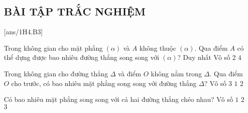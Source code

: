 \subsection{BÀI TẬP TRẮC NGHIỆM}
[ans/1H4.B3]
\setcounter{ex}{0}

\begin{ex} Trong không gian cho mặt phẳng $(\alpha)$ và $A$ không thuộc $(\alpha)$. Qua điểm $A$ có thể dựng được bao nhiêu đường thẳng song song với $(\alpha)$?
	\choice
	{Duy nhất}
	{\True Vô số }
	{$2$}
	{$4$}
	\loigiai{}
\end{ex}
\begin{ex}%
	Trong không gian cho đường thẳng $\Delta$ và điểm $O$ không nằm trong $\Delta$. Qua điểm $O$ cho trước, có bao nhiêu mặt phẳng song song với đường thẳng $\Delta$?
	\choice
	{\True Vô số}
	{ $3$}
	{ $1$}
	{ $2$}
\end{ex}

\begin{ex}%
	Có bao nhiêu mặt phẳng song song với cả hai đường thẳng chéo nhau?
	\choice
	{\True Vô số}
	{$1 $}
	{$2 $}
	{$3 $}
	\loigiai{}
\end{ex}

